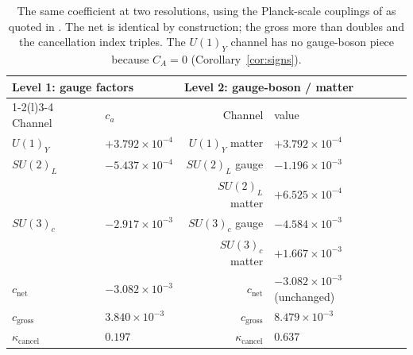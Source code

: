 \documentclass[11pt]{article}
\theoremstyle{definition}
\theoremstyle{remark}
\newcommand{\net}{c_{\mathrm{net}}}
\newcommand{\gross}{c_{\mathrm{gross}}}
\newcommand{\kcancel}{\kappa_{\mathrm{cancel}}}
\begin{document}
\begin{table}[t]
\centering
\small
\begin{tabular}{@{}ll r l@{}}
\toprule
\multicolumn{2}{l}{Level 1: gauge factors} & \multicolumn{2}{l}{Level 2: gauge-boson / matter} \\
\cmidrule(r){1-2}\cmidrule(l){3-4}
Channel & $c_a$ & Channel & value \\
\midrule
$U(1)_Y$ & $+3.792\times 10^{-4}$ & $U(1)_Y$ matter & $+3.792\times 10^{-4}$ \\
$SU(2)_L$ & $-5.437\times 10^{-4}$ & $SU(2)_L$ gauge & $-1.196\times 10^{-3}$ \\
 & & $SU(2)_L$ matter & $+6.525\times 10^{-4}$ \\
$SU(3)_c$ & $-2.917\times 10^{-3}$ & $SU(3)_c$ gauge & $-4.584\times 10^{-3}$ \\
 & & $SU(3)_c$ matter & $+1.667\times 10^{-3}$ \\
\midrule
$\net$ & $-3.082\times 10^{-3}$ & $\net$ & $-3.082\times 10^{-3}$ (unchanged) \\
$\gross$ & $3.840\times 10^{-3}$ & $\gross$ & $8.479\times 10^{-3}$ \\
$\kcancel$ & $0.197$ & $\kcancel$ & $0.637$ \\
\bottomrule
\end{tabular}
\caption{The same coefficient at two resolutions, using the Planck-scale couplings of
\citet{Buttazzo2013} as quoted in \citet{TurokBoyle2023}. The net is identical by construction; the
gross more than doubles and the cancellation index triples. The $U(1)_Y$ channel has no
gauge-boson piece because $C_A=0$ (Corollary~\ref{cor:signs}).}
\label{tab:levels}
\end{table}
\end{document}
